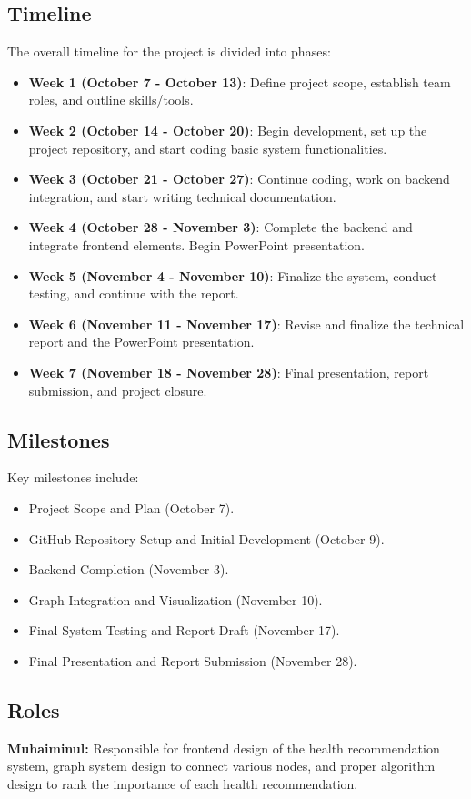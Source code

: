 \documentclass{article}
\begin{document}
\subsection{Timeline}
The overall timeline for the project is divided into phases:
\begin{itemize}
    \item \textbf{Week 1 (October 7 - October 13)}: Define project scope, establish team roles, and outline skills/tools.
    \item \textbf{Week 2 (October 14 - October 20)}: Begin development, set up the project repository, and start coding basic system functionalities.
    \item \textbf{Week 3 (October 21 - October 27)}: Continue coding, work on backend integration, and start writing technical documentation.
    \item \textbf{Week 4 (October 28 - November 3)}: Complete the backend and integrate frontend elements. Begin PowerPoint presentation.
    \item \textbf{Week 5 (November 4 - November 10)}: Finalize the system, conduct testing, and continue with the report.
    \item \textbf{Week 6 (November 11 - November 17)}: Revise and finalize the technical report and the PowerPoint presentation.
    \item \textbf{Week 7 (November 18 - November 28)}: Final presentation, report submission, and project closure.
\end{itemize}

\subsection{Milestones}
Key milestones include:
\begin{itemize}
    \item Project Scope and Plan (October 7).
    \item GitHub Repository Setup and Initial Development (October 9).
    \item Backend Completion (November 3).
    \item Graph Integration and Visualization (November 10).
    \item Final System Testing and Report Draft (November 17).
    \item Final Presentation and Report Submission (November 28).
\end{itemize}

\subsection{Roles}
\textbf{Muhaiminul:} Responsible for frontend design of the health recommendation system, graph system design to connect various nodes, and proper algorithm design to rank the importance of each health recommendation.
\end{document}
